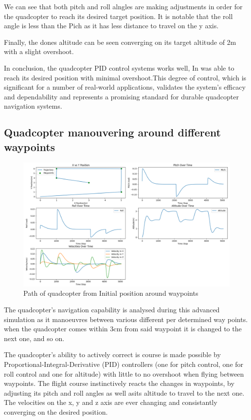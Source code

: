 \documentclass{report}
\begin{document}
We can see that both pitch and roll alngles are making adjustments in order for the quadcopter to reach its desired target position. It is notable that the roll angle is less than the Pich as it has less distance to travel on the y axis.

Finally, the dones altitude can be seen converging on its target altitude of 2m with a slight overshoot.

In conclusion, the quadcopter PID control systems works well, In was able to reach its desired position with minimal overshoot.This degree of control, which is significant for a number of real-world applications, validates the system's efficacy and dependability and represents a promising standard for durable quadcopter navigation systems.


\subsection*{Quadcopter manouvering around different waypoints}
\begin{figure}[H]
  \centering
  \includegraphics[width=1\textwidth]{Pictures/Position_control_sim_various_waypoints.png} 
  \captionsetup{justification=centering}
  \caption{Path of quadcopter from Initial position around waypoints}
  \label{fig:Drone_path_multiple_waypoints}
\end{figure}
The quadcopter’s navigation capability is analysed during this advanced simulation as it manoeuvres between various different per determined way points. when the quadcopter comes within 3cm from said waypoint it is changed to the next one, and so on.

The quadcopter’s ability to actively correct is course is made possible by Proportional-Integral-Derivative (PID) controllers (one for pitch control, one for roll control and one for altitude) with little to no overshoot when flying between waypoints. The flight course instinctively reacts the changes in waypoints, by adjusting its pitch and roll angles as well asits altitude to travel to the next one. The velocities on the x, y and z axis are ever 
changing and consistantly converging on the desired position.
\end{document}
